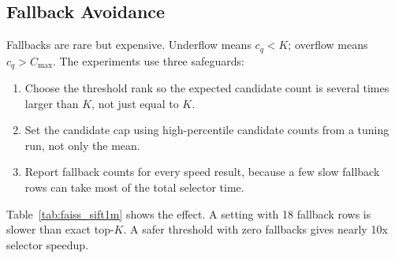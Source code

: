 \subsection{Fallback Avoidance}

Fallbacks are rare but expensive. Underflow means $c_q<K$; overflow means
$c_q>C_{\max}$. The experiments use three safeguards:

\begin{enumerate}
  \item Choose the threshold rank so the expected candidate count is several
        times larger than $K$, not just equal to $K$.
  \item Set the candidate cap using high-percentile candidate counts from a
        tuning run, not only the mean.
  \item Report fallback counts for every speed result, because a few slow
        fallback rows can take most of the total selector time.
\end{enumerate}

Table~\ref{tab:faiss_sift1m} shows the effect. A setting with 18 fallback rows
is slower than exact top-$K$. A safer threshold with zero fallbacks gives nearly
10x selector speedup.
